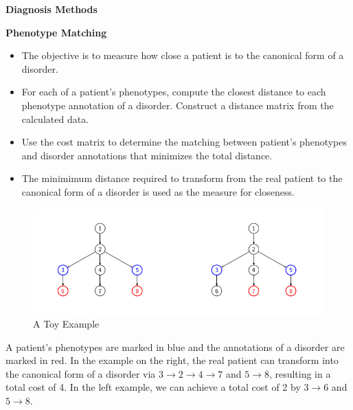 \documentclass[final]{beamer} %
\begin{document}
\begin{frame}{}
\begin{columns}[T]
\begin{column}{0.3\linewidth}
{\begin{block}{\Huge \textbf{Diagnosis Methods}}
       \begin{block}{\Large \textbf{Phenotype Matching}}
         \begin{itemize}
           \Large
         \item The objective is to measure how close a patient is to
           the canonical form of a disorder.
         \item For each of a patient's phenotypes, compute the closest
           distance to each phenotype annotation of a
           disorder. Construct a distance matrix from the calculated
           data.
         \item Use the cost matrix to determine the matching between
           patient's phenotypes and disorder annotations that
           minimizes the total distance.
         \item The minimimum distance required to transform from the
           real patient to the canonical form of a disorder is used as
           the measure for closeness.
         \end{itemize}
         \vspace{0.5cm}
         \begin{figure}
           \centering
           \includegraphics[width=.9\textwidth]{toy_ontology}
           \vspace{0.5cm}
           \caption*{\large A Toy Example}
         \end{figure}
         \Large A patient's phenotypes are marked in blue and the
         annotations of a disorder are marked in red. In the example
         on the right, the real patient can transform into the
         canonical form of a disorder via $3 \rightarrow 2 \rightarrow
         4 \rightarrow 7$ and $5 \rightarrow 8$, resulting in a total
         cost of 4. In the left example, we can achieve a total cost
         of 2 by $3 \rightarrow 6$ and $5 \rightarrow 8$.
       \end{block}
     \end{block}
   }
 \end{column}


\end{columns}
\end{frame}
\end{document}
